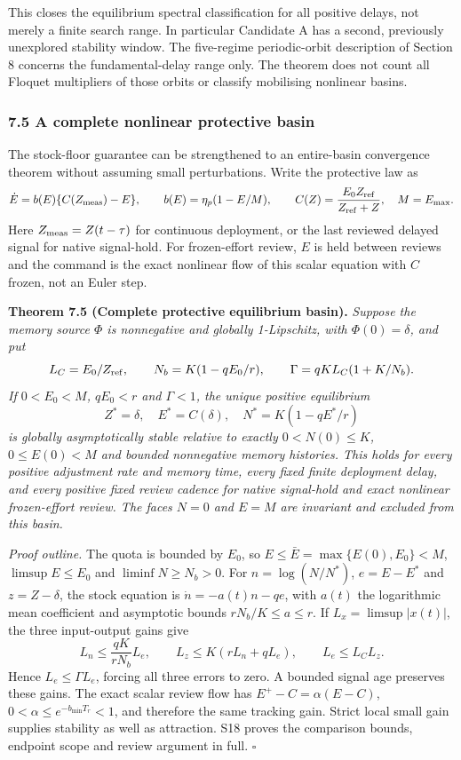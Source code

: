 This closes the equilibrium spectral classification for all positive
delays, not merely a finite search range. In particular Candidate A has
a second, previously unexplored stability window. The five-regime
periodic-orbit description of Section 8 concerns the fundamental-delay
range only. The theorem does not count all Floquet multipliers of those
orbits or classify mobilising nonlinear basins.

\subsubsection{7.5 A complete nonlinear protective basin}
\label{complete-protective-basin}
The stock-floor guarantee can be strengthened to an entire-basin
convergence theorem without assuming small perturbations. Write the
protective law as
\[
 \dot E=b(E)\{C(Z_{\rm meas})-E\},\qquad
 b(E)=\eta_p(1-E/M),\qquad
 C(Z)=\frac{E_0Z_{\rm ref}}{Z_{\rm ref}+Z},\quad M=E_{\max}.
\]
Here $Z_{\rm meas}=Z(t-\tau)$ for continuous deployment, or the last
reviewed delayed signal for native signal-hold. For frozen-effort review,
$E$ is held between reviews and the command is the exact nonlinear
flow of this scalar equation with $C$ frozen, not an Euler step.

\textbf{Theorem 7.5 (Complete protective equilibrium basin).}
\emph{Suppose the memory source $\Phi$ is nonnegative and globally
1-Lipschitz, with $\Phi(0)=\delta$, and put}
\[
 L_C=E_0/Z_{\rm ref},\qquad
 N_b=K(1-qE_0/r),\qquad
 \Gamma=qKL_C(1+K/N_b).
\]
\emph{If $0<E_0<M$, $qE_0<r$ and $\Gamma<1$, the unique positive equilibrium}
\[
 Z^*=\delta,\quad E^*=C(\delta),\quad N^*=K(1-qE^*/r)
\]
\emph{is globally asymptotically stable relative to exactly
$0<N(0)\le K$, $0\le E(0)<M$ and bounded nonnegative memory histories.
This holds for every positive adjustment rate and memory time, every
fixed finite deployment delay, and every positive fixed review cadence
for native signal-hold and exact nonlinear frozen-effort review. The
faces $N=0$ and $E=M$ are invariant and excluded from this basin.}

\emph{Proof outline.} The quota is bounded by $E_0$, so
$E\le\bar E=\max\{E(0),E_0\}<M$, $\limsup E\le E_0$ and
$\liminf N\ge N_b>0$. For $n=\log(N/N^*)$, $e=E-E^*$ and
$z=Z-\delta$, the stock equation is $\dot n=-a(t)n-qe$, with
$a(t)$ the logarithmic mean coefficient and asymptotic bounds
$rN_b/K\le a\le r$. If $L_x=\limsup|x(t)|$, the three input-output gains give
\[
 L_n\le\frac{qK}{rN_b}L_e,\qquad
 L_z\le K(rL_n+qL_e),\qquad L_e\le L_CL_z.
\]
Hence $L_e\le\Gamma L_e$, forcing all three errors to zero. A bounded
signal age preserves these gains. The exact scalar review flow has
$E^+-C=\alpha(E-C)$, $0<\alpha\le e^{-b_{\min}T_r}<1$, and therefore
the same tracking gain. Strict local small gain supplies stability as
well as attraction. S18 proves the comparison bounds, endpoint scope
and review argument in full. \hfill$\square$

